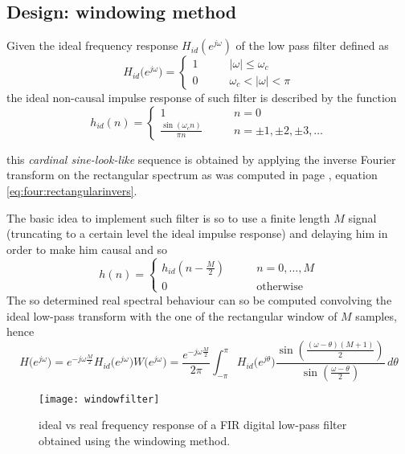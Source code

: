 	\subsection{Design: windowing method}
		Given the ideal frequency response $H_{id}(e^{j\omega})$ of the low pass filter defined as
		\[ H_{id} \big(e^{j\omega}\big) = \begin{cases}
			1 \qquad & |\omega| \leq \omega_c \\0 & \omega_c < |\omega| < \pi
		\end{cases} \]
		the ideal non-causal impulse response of such filter is described by the function
		\[ h_{id}(n) = \begin{cases}
			1 & n = 0\\
			\frac{\sin(\omega_cn)}{\pi n} \qquad & n = \pm 1,\pm 2,\pm 3,\dots
		\end{cases} \]
		\begin{note}
			this \textit{cardinal sine-look-like} sequence is obtained by applying the inverse Fourier transform on the rectangular spectrum as was computed in page \pageref{eq:four:rectangularinvers}, equation \ref{eq:four:rectangularinvers}.
		\end{note}
		The basic idea to implement such filter is so to use a finite length $M$ signal (truncating to a certain level the ideal impulse response) and delaying him in order to make him causal and so
		\begin{equation}
			h(n) = \begin{cases}
				h_{id}\left(n-\frac M2\right) \qquad & n = 0,\dots,M \\0 & \textrm{otherwise}
			\end{cases}
		\end{equation}
		The so determined real spectral behaviour can so be computed convolving the ideal low-pass transform with the one of the rectangular window of $M$ samples, hence
		\begin{equation}
			H\big(e^{j\omega}\big) = e^{-j\omega \frac M2} H_{id}\big(e^{j\omega}\big)  W \big(e^{j\omega}\big) = \frac{e^{-j\omega \frac M2}}{2\pi} \int_{-\pi}^{\pi} H_{id}\big(e^{j\theta}\big) \frac{ \sin \left( \frac{(\omega-\theta)(M+1)}{2} \right)  }{\sin \left( \frac{\omega - \theta}{2} \right)}\, d\theta
		\end{equation}
		
		\begin{SCfigure}[2][b!t]
			\centering \texttt{[image: windowfilter]}
			\caption{ideal vs real frequency response of a FIR  digital low-pass filter obtained using the windowing method.} \label{fig:filt:windowlowpass}
		\end{SCfigure}
		
